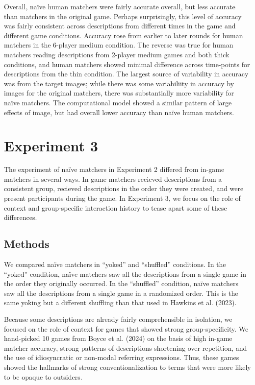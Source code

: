 \documentclass[10pt, letterpaper]{article}
\begin{document}
Overall, naïve human matchers were fairly accurate overall, but less
accurate than matchers in the original game. Perhaps surprisingly, this
level of accuracy was fairly consistent across descriptions from
different times in the game and different game conditions. Accuracy rose
from earlier to later rounds for human matchers in the 6-player medium
condition. The reverse was true for human matchers reading descriptions
from 2-player medium games and both thick conditions, and human matchers
showed minimal difference across time-points for descriptions from the
thin condition. The largest source of variability in accuracy was from
the target images; while there was some variabiliity in accuracy by
images for the original matchers, there was substantially more
variability for naïve matchers. The computational model showed a similar
pattern of large effects of image, but had overall lower accuracy than
naïve human matchers.

\section{Experiment 3}\label{experiment-3}

The experiment of naïve matchers in Experiment 2 differed from in-game
matchers in several ways. In-game matchers recieved descriptions from a
consistent group, recieved descriptions in the order they were created,
and were present participants during the game. In Experiment 3, we focus
on the role of context and group-specific interaction history to tease
apart some of these differences.

\subsection{Methods}\label{methods-2}

We compared naïve matchers in ``yoked'' and ``shuffled'' conditions. In
the ``yoked'' condition, naïve matchers saw all the descriptions from a
single game in the order they originally occurred. In the ``shuffled''
condition, naïve matchers saw all the descriptions from a single game in
a randomized order. This is the same yoking but a different shuffling
than that used in Hawkins et al. (2023).

Because some descriptions are already fairly comprehensible in
isolation, we focused on the role of context for games that showed
strong group-specificity. We hand-picked 10 games from Boyce et al.
(2024) on the basis of high in-game matcher accuracy, strong patterns of
descriptions shortening over repetition, and the use of idiosyncratic or
non-modal referring expressions. Thus, these games showed the hallmarks
of strong conventionalization to terms that were more likely to be
opaque to outsiders.
\end{document}
